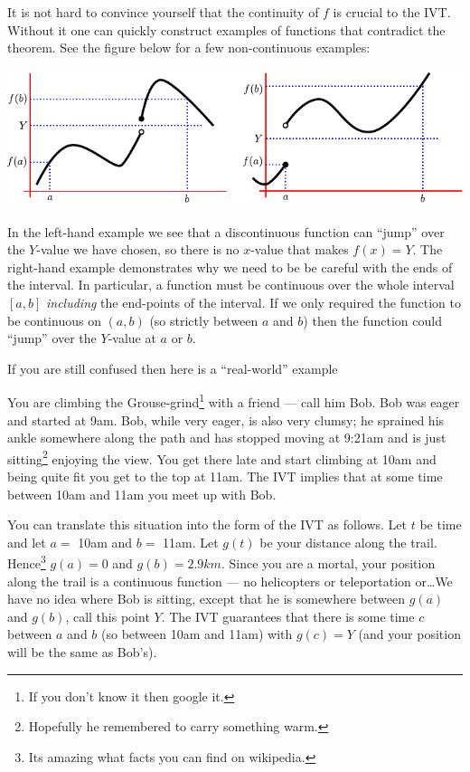 It is not hard to convince yourself that the continuity of $f$ is crucial to
the IVT. Without it one can quickly construct examples of functions that
contradict the theorem. See the figure below for a few non-continuous examples:
\begin{fig}
\begin{center}
 \includegraphics[height=4cm]{IVT2}
\end{center}
\end{fig}
In the left-hand example we see that a discontinuous function can ``jump'' over
the $Y$-value we have chosen, so there is no $x$-value that makes $f(x)=Y$. The
right-hand example demonstrates why we need to be be careful with the ends of
the interval. In particular, a function must be continuous over the whole
interval $[a,b]$ \emph{including} the end-points of the interval. If we only
required the function to be continuous on $(a,b)$ (so strictly between $a$ and
$b$) then the function could ``jump'' over the $Y$-value at $a$ or $b$.

If you are still confused then here is a ``real-world'' example
\begin{eg}
 You are climbing the Grouse-grind\footnote{If you don't know it then google
it.} with a friend --- call him Bob. Bob was eager and started at 9am. Bob,
while very eager, is also very clumsy; he sprained his ankle somewhere
along the path and has stopped moving at 9:21am and is just
sitting\footnote{Hopefully he remembered to carry something warm.} enjoying the
view. You get there late and start climbing at 10am and being quite fit you get to the
top at 11am. The IVT implies that at some time between 10am and 11am you
meet up with Bob.

You can translate this situation into the form of the IVT as follows. Let $t$
be time and let $a = $ 10am and $b=$ 11am. Let $g(t)$ be your distance
along the trail. Hence\footnote{Its amazing what facts you can find
on wikipedia.} $g(a) = 0$ and
$g(b) = 2.9km$. Since you are a mortal, your position along the trail is a
continuous function --- no helicopters or teleportation or\dots We have no idea
where Bob is sitting, except that he is somewhere between $g(a)$ and
$g(b)$, call this point $Y$. The IVT guarantees that there is some time $c$
between $a$ and $b$ (so between 10am and 11am) with $g(c) = Y$ (and your
position will be the same as Bob's).
\end{eg}

